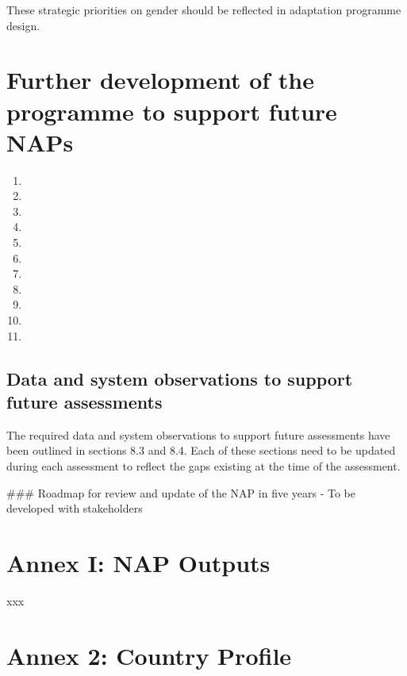\documentclass[
]{book}
\providecommand{\tightlist}{%
  \setlength{\itemsep}{0pt}\setlength{\parskip}{0pt}}
\begin{document}
These strategic priorities on gender should be reflected in adaptation programme design.

\hypertarget{further-development-of-the-programme-to-support-future-naps}{%
\chapter{Further development of the programme to support future NAPs}\label{further-development-of-the-programme-to-support-future-naps}}

\begin{enumerate}
\def\labelenumi{\arabic{enumi}.}
\tightlist
\item
\item
\item
\item
\item
\item
\item
\item
\item
\item
\item
\end{enumerate}

\hypertarget{data-and-system-observations-to-support-future-assessments}{%
\section{Data and system observations to support future assessments}\label{data-and-system-observations-to-support-future-assessments}}

The required data and system observations to support future assessments have been outlined in sections 8.3 and 8.4. Each of these sections need to be updated during
each assessment to reflect the gaps existing at the time of the assessment.

\#\#\# Roadmap for review and update of the NAP in five years
- To be developed with stakeholders

\hypertarget{annex-i-nap-outputs}{%
\chapter{Annex I: NAP Outputs}\label{annex-i-nap-outputs}}

xxx

\hypertarget{annex-2-country-profile}{%
\chapter{Annex 2: Country Profile}\label{annex-2-country-profile}}
\end{document}
